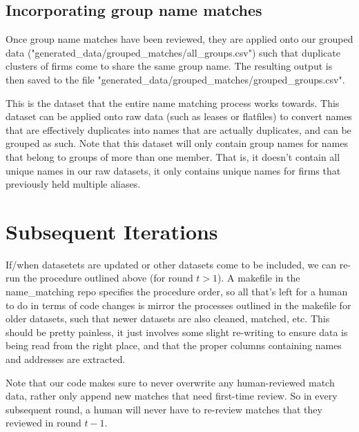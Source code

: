\documentclass{article}
\begin{document}
\subsection{Incorporating group name matches}

Once group name matches have been reviewed, they are applied onto our grouped data ("generated\_data/grouped\_matches/all\_groups.csv") such that duplicate clusters of firms come to share the same group name. The resulting output is then saved to the file "generated\_data/grouped\_matches/grouped\_groups.csv". 

This is the dataset that the entire name matching process works towards. This dataset can be applied onto raw data (such as leases or flatfiles) to convert names that are effectively duplicates into names that are actually duplicates, and can be grouped as such. Note that this dataset will only contain group names for names that belong to groups of more than one member. That is, it doesn't contain all unique names in our raw datasets, it only contains unique names for firms that previously held multiple aliases.  

\section{Subsequent Iterations}
If/when datasetets are updated or other datasets come to be included, we can re-run the procedure outlined above (for round $t > 1$). A makefile in the name\_matching repo specifies the procedure order, so all that's left for a human to do in terms of code changes is mirror the processes outlined in the makefile for older datasets, such that newer datasets are also cleaned, matched, etc. This should be pretty painless, it just involves some slight re-writing to ensure data is being read from the right place, and that the proper columns containing names and addresses are extracted. 

Note that our code makes sure to never overwrite any human-reviewed match data, rather only append new matches that need first-time review. So in every subsequent round, a human will never have to re-review matches that they reviewed in round $t - 1$.  
\end{document}

